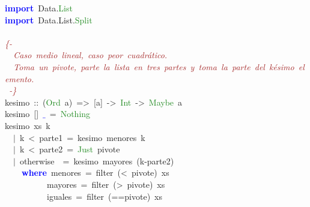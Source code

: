 \noindent
\mbox{}\textbf{\textcolor{Blue}{import}}\ Data\textcolor{BrickRed}{.}\textcolor{ForestGreen}{List} \\
\mbox{}\textbf{\textcolor{Blue}{import}}\ Data\textcolor{BrickRed}{.}List\textcolor{BrickRed}{.}\textcolor{ForestGreen}{Split} \\
\mbox{} \\
\mbox{}\textit{\textcolor{Brown}{\{-}} \\
\mbox{}\textit{\textcolor{Brown}{\ \ Caso\ medio\ lineal,\ caso\ peor\ cuadrático.}} \\
\mbox{}\textit{\textcolor{Brown}{\ \ Toma\ un\ pivote,\ parte\ la\ lista\ en\ tres\ partes\ y\ toma\ la\ parte\ del\ késimo\ elemento.\ }} \\
\mbox{}\textit{\textcolor{Brown}{\ -\}}} \\
\mbox{}kesimo\ \textcolor{BrickRed}{::}\ \textcolor{BrickRed}{(}\textcolor{ForestGreen}{Ord}\ a\textcolor{BrickRed}{)}\ \textcolor{BrickRed}{=\textgreater{}}\ \textcolor{BrickRed}{[}a\textcolor{BrickRed}{]}\ \textcolor{BrickRed}{-\textgreater{}}\ \textcolor{ForestGreen}{Int}\ \textcolor{BrickRed}{-\textgreater{}}\ \textcolor{ForestGreen}{Maybe}\ a \\
\mbox{}kesimo\ \textcolor{BrickRed}{[]}\ \textbf{\textcolor{Blue}{$\_$}}\ \textcolor{BrickRed}{=}\ \textcolor{ForestGreen}{Nothing} \\
\mbox{}kesimo\ xs\ k \\
\mbox{}\ \ \textcolor{BrickRed}{$|$}\ k\ \textcolor{BrickRed}{\textless{}}\ parte1\ \textcolor{BrickRed}{=}\ kesimo\ menores\ k \\
\mbox{}\ \ \textcolor{BrickRed}{$|$}\ k\ \textcolor{BrickRed}{\textless{}}\ parte2\ \textcolor{BrickRed}{=}\ \textcolor{ForestGreen}{Just}\ pivote\  \\
\mbox{}\ \ \textcolor{BrickRed}{$|$}\ otherwise\ \ \textcolor{BrickRed}{=}\ kesimo\ mayores\ \textcolor{BrickRed}{(}k\textcolor{BrickRed}{-}parte2\textcolor{BrickRed}{)} \\
\mbox{}\ \ \ \ \textbf{\textcolor{Blue}{where}}\ menores\ \textcolor{BrickRed}{=}\ filter\ \textcolor{BrickRed}{(\textless{}}\ pivote\textcolor{BrickRed}{)}\ xs \\
\mbox{}\ \ \ \ \ \ \ \ \ \ mayores\ \textcolor{BrickRed}{=}\ filter\ \textcolor{BrickRed}{(\textgreater{}}\ pivote\textcolor{BrickRed}{)}\ xs \\
\mbox{}\ \ \ \ \ \ \ \ \ \ iguales\ \textcolor{BrickRed}{=}\ filter\ \textcolor{BrickRed}{(==}pivote\textcolor{BrickRed}{)}\ xs \\

